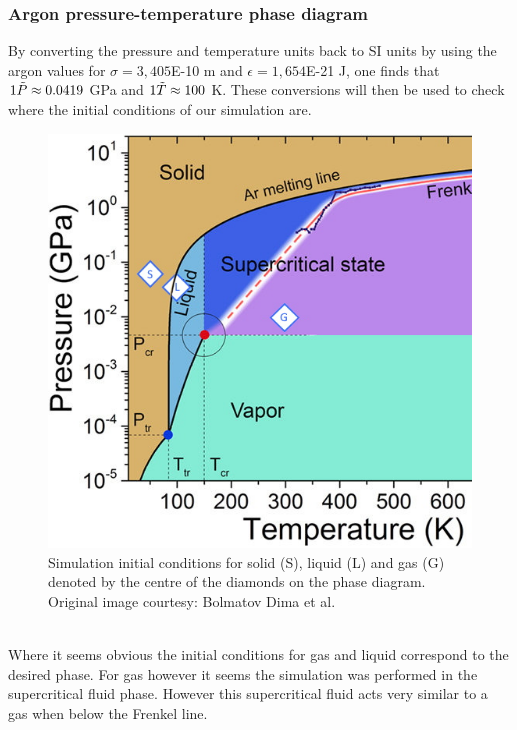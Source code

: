 \documentclass[a4paper,12pt]{article} %
\begin{document}
\subsubsection{Argon pressure-temperature phase diagram}
By converting the pressure and temperature units back to SI units by using the argon values for $\sigma = 3,405 $E-10 m and $\epsilon = 1,654 $E-21 J, one finds that $1 \Tilde{P} \approx 0.0419$ GPa and $1 \Tilde{T} \approx 100$ K. These conversions will then be used to check where the initial conditions of our simulation are.
\begin{figure}[!h]
    \centering
    \includegraphics[width=0.5\linewidth]{Images/PhasesArgon.jpg}
    \caption{Simulation initial conditions for solid (S), liquid (L) and gas (G) denoted by the centre of the diamonds on the phase diagram. Original image courtesy: Bolmatov Dima et al. \cite{Frenkel1}}
    \label{fig:my_label}
\end{figure}\\
Where it seems obvious the initial conditions for gas and liquid correspond to the desired phase. For gas however it seems the simulation was performed in the supercritical fluid phase. However this supercritical fluid acts very similar to a gas when below the Frenkel line.\cite{Frenkel1}\cite{Frenkel2}
\newpage
\end{document}

